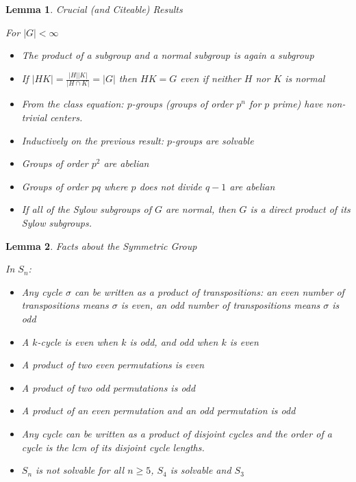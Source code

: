 \documentclass[12pt]{Qual}
\newtheorem{lemma}{Lemma}
\begin{document}
\vspace{0.5cm}
\begin{lemma}{\Large\textit{Crucial (and Citeable) Results}}

For $|G|<\infty$

\begin{itemize}
\renewcommand\labelitemi{\faCoffee}
    \item The product of a subgroup and a normal subgroup is again a subgroup
    \item If $|HK|=\frac{|H||K|}{|H\cap K|}=|G|$ then $HK=G$ even if neither $H$ nor $K$ is normal
    \item From the class equation: $p$-groups (groups of order $p^n$ for $p$ prime) have non-trivial centers.
    \item Inductively on the previous result: $p$-groups are solvable
    \item Groups of order $p^2$ are abelian
    \item Groups of order $pq$ where $p$ does not divide $q-1$ are abelian
    \item If all of the Sylow subgroups of $G$ are normal, then $G$ is a direct product of its Sylow subgroups.
\end{itemize}

\end{lemma}
\vspace{0.5cm}
\begin{lemma}{\Large\textit{Facts about the Symmetric Group}}

In $S_n$:

\begin{itemize}
\renewcommand\labelitemi{\faCoffee}
    \item Any cycle $\sigma$ can be written as a product of transpositions: an even number of transpositions means $\sigma$ is even, an odd number of transpositions means $\sigma$ is odd
    \item A $k$-cycle is even when $k$ is odd, and odd when $k$ is even
    \item A product of two even permutations is even
    \item A product of two odd permutations is odd
    \item A product of an even permutation and an odd permutation is odd
    \item Any cycle can be written as a product of disjoint cycles and the order of a cycle is the lcm of its disjoint cycle lengths.
    \item $S_n$ is not solvable for all $n\ge5$, $S_4$ is solvable and $S_3$
\end{itemize}

\end{lemma}
\end{document}
